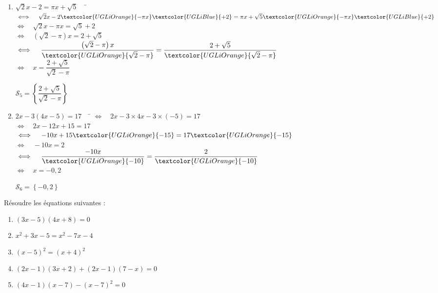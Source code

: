 \documentclass[a4paper,11pt,exos]{nsi} %
\begin{document}
\begin{enumerate}
    \item \begin{tabbing}
        $\sqrt{2}x-2=\pi x +\sqrt{5} \quad$ \=  $\iff\quad \sqrt{2}x -2 \textcolor{UGLiOrange}{-\pi x} \textcolor{UGLiBlue}{+2}=\pi x +\sqrt{5}\textcolor{UGLiOrange}{-\pi x}\textcolor{UGLiBlue}{+2}$\\[.5em]
        \>  $\iff\quad \sqrt{2}x-\pi x= \sqrt{5}+2$\\[.5em]
        \>  $\iff\quad \left(\sqrt{2}-\pi\right)x=2+\sqrt{5}$\\[.5em]
        \>  $\iff\quad \dfrac{\left(\sqrt{2}-\pi\right)x}{\textcolor{UGLiOrange}{\sqrt{2}-\pi}}=\dfrac{2+\sqrt{5}}{\textcolor{UGLiOrange}{\sqrt{2}-\pi}}$\\[.5em]
        \>  $\iff\quad x=\dfrac{2+\sqrt{5}}{\sqrt{2}-\pi}$
    \end{tabbing}
    $\mathcal{S}_5=\left\{\dfrac{2+\sqrt{5}}{\sqrt{2}-\pi}\right\}$

    \item \begin{tabbing}
        $2x-3(4x-5)=17 \quad$   \= $\iff\quad 2x-3\times 4x-3\times (-5)=17$\\
        \>  $\iff\quad 2x-12x+15=17$\\
        \>  $\iff\quad -10x+15\textcolor{UGLiOrange}{-15}=17\textcolor{UGLiOrange}{-15}$\\
        \>  $\iff\quad -10x=2$\\
        \>  $\iff\quad \dfrac{-10x}{\textcolor{UGLiOrange}{-10}}=\dfrac{2}{\textcolor{UGLiOrange}{-10}}$\\[.5em]
        \>  $\iff\quad x=-0,2$
    \end{tabbing}
    $\mathcal{S}_6=\left\{-0,2\right\}$
\end{enumerate}

\begin{exercice}[]
	Résoudre les équations suivantes :
	\begin{multicols}{2}
		\begin{enumerate}
			\item 	$(3x-5)(4x+8)=0$
			\item 	$x^2+3x-5=x^2-7x-4$
			\item	$(x-5)^2=(x+4)^2$
			\item	$(2x-1)(3x+2)+(2x-1)(7-x)=0$
			\item	$(4x-1)(x-7)-(x-7)^2=0$\\
				
		\end{enumerate}
	\end{multicols}
\end{exercice}
\end{document}
